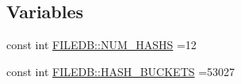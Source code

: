 \subsection*{Variables}
\begin{DoxyCompactItemize}
\item 
const int \mbox{\hyperlink{namespaceFILEDB_ae46b35f4ae3d23ec8b3470306fef8ab5}{F\+I\+L\+E\+D\+B\+::\+N\+U\+M\+\_\+\+H\+A\+S\+HS}} =12
\item 
const int \mbox{\hyperlink{namespaceFILEDB_a791b55170820bb840d3e7d583f363415}{F\+I\+L\+E\+D\+B\+::\+H\+A\+S\+H\+\_\+\+B\+U\+C\+K\+E\+TS}} =53027
\end{DoxyCompactItemize}
